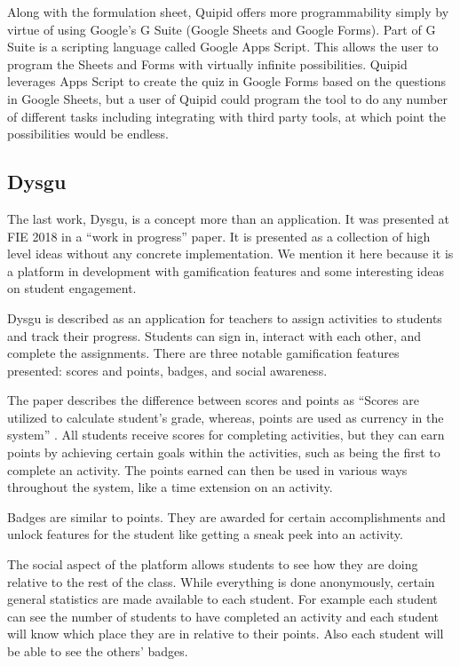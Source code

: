 \documentclass{article}
\begin{document}
        Along with the formulation sheet, Quipid offers more programmability simply by virtue of using Google's G Suite (Google Sheets and Google Forms). Part of G Suite is a scripting language called Google Apps Script. This allows the user to program the Sheets and Forms with virtually infinite possibilities. Quipid leverages Apps Script to create the quiz in Google Forms based on the questions in Google Sheets, but a user of Quipid could program the tool to do any number of different tasks including integrating with third party tools, at which point the possibilities would be endless.  
        
    \subsection{Dysgu}
        The last work, Dysgu, is a concept more than an application. It was presented at FIE 2018 in a ``work in progress'' paper. It is presented as a collection of high level ideas without any concrete implementation. We mention it here because it is a platform in development with gamification features and some interesting ideas on student engagement.
        \smallskip
        
        Dysgu is described as an application for teachers to assign activities to students and track their progress. Students can sign in, interact with each other, and complete the assignments. There are three notable gamification features presented: scores and points, badges, and social awareness.
        \smallskip
        
        The paper describes the difference between scores and points as ``Scores are utilized to calculate student’s grade, whereas, points are used as currency in the system'' \cite{dysgu}. All students receive scores for completing activities, but they can earn points by achieving certain goals within the activities, such as being the first to complete an activity. The points earned can then be used in various ways throughout the system, like a time extension on an activity. 
        \smallskip
        
        Badges are similar to points. They are awarded for certain accomplishments and unlock features for the student like getting a sneak peek into an activity.   
        \smallskip
        
        The social aspect of the platform allows students to see how they are doing relative to the rest of the class. While everything is done anonymously, certain general statistics are made available to each student. For example each student can see the number of students to have completed an activity and each student will know which place they are in relative to their points. Also each student will be able to see the others' badges. 
\end{document}
